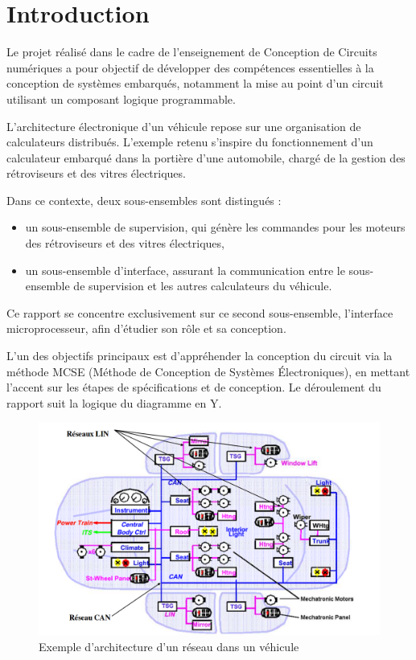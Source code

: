 \section{Introduction}

Le projet réalisé dans le cadre de l'enseignement de Conception de Circuits numériques a pour 
objectif de développer des compétences essentielles à la conception de systèmes embarqués, 
notamment la mise au point d'un circuit utilisant un composant logique programmable.
\newline

L'architecture électronique d'un véhicule repose sur une organisation de calculateurs distribués. 
L'exemple retenu s'inspire du fonctionnement d'un calculateur embarqué dans la portière d'une 
automobile, chargé de la gestion des rétroviseurs et des vitres électriques.
\newline

Dans ce contexte, deux sous-ensembles sont distingués : 
\begin{itemize}
    \item un sous-ensemble de supervision, qui génère les commandes pour les moteurs des rétroviseurs et des vitres électriques,
    \item un sous-ensemble d'interface, assurant la communication entre le sous-ensemble de supervision et les autres calculateurs du véhicule.
\end{itemize}

Ce rapport se concentre exclusivement sur ce second sous-ensemble, l'interface microprocesseur, afin d'étudier son rôle et sa conception.

L'un des objectifs principaux est d'appréhender la conception du circuit via la méthode MCSE (Méthode de Conception de Systèmes Électroniques), en mettant l'accent sur les étapes de spécifications et de conception. Le déroulement du rapport suit la logique du diagramme en Y.

\begin{figure}[H]
    \centering
    \includegraphics[width=0.8\linewidth]{images/Intro/Architecture_LIN.png}
    \caption{Exemple d'architecture d'un réseau dans un véhicule}
    \label{fig:placeholder}
\end{figure}